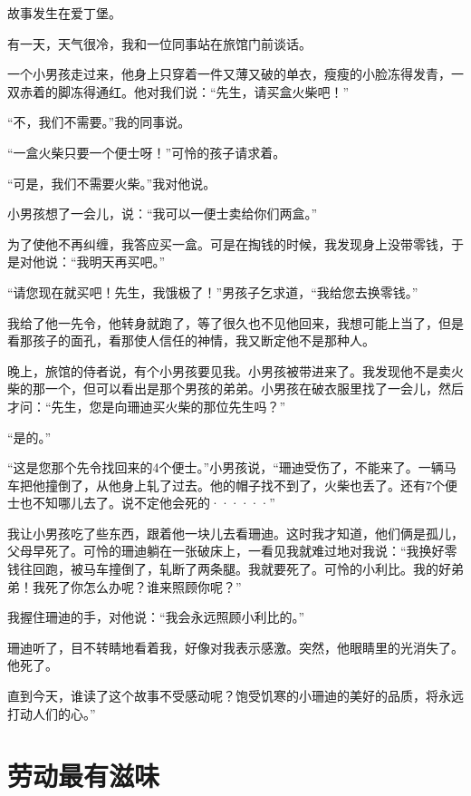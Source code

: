 \documentclass[12pt,UTF-8,openany]{ctexbook}
\begin{document}
\begin{large}
    
    故事发生在爱丁堡。
    
    有一天，天气很冷，我和一位同事站在旅馆门前谈话。
    
    一个小男孩走过来，他身上只穿着一件又薄又破的单衣，瘦瘦的小脸冻得发青，一双赤着的脚冻得通红。他对我们说：“先生，请买盒火柴吧！”
    
    “不，我们不需要。”我的同事说。
    
    “一盒火柴只要一个便士呀！”可怜的孩子请求着。
    
    “可是，我们不需要火柴。”我对他说。
    
    小男孩想了一会儿，说：“我可以一便士卖给你们两盒。”
    
    为了使他不再纠缠，我答应买一盒。可是在掏钱的时候，我发现身上没带零钱，于是对他说：“我明天再买吧。”
    
    “请您现在就买吧！先生，我饿极了！”男孩子乞求道，“我给您去换零钱。”
    
    我给了他一先令，他转身就跑了，等了很久也不见他回来，我想可能上当了，但是看那孩子的面孔，看那使人信任的神情，我又断定他不是那种人。
    
    晚上，旅馆的侍者说，有个小男孩要见我。小男孩被带进来了。我发现他不是卖火柴的那一个，但可以看出是那个男孩的弟弟。小男孩在破衣服里找了一会儿，然后才问：“先生，您是向珊迪买火柴的那位先生吗？”
    
    “是的。”
    
    “这是您那个先令找回来的4个便士。”小男孩说，“珊迪受伤了，不能来了。一辆马车把他撞倒了，从他身上轧了过去。他的帽子找不到了，火柴也丢了。还有7个便士也不知哪儿去了。说不定他会死的······”
    
    我让小男孩吃了些东西，跟着他一块儿去看珊迪。这时我才知道，他们俩是孤儿，父母早死了。可怜的珊迪躺在一张破床上，一看见我就难过地对我说：“我换好零钱往回跑，被马车撞倒了，轧断了两条腿。我就要死了。可怜的小利比。我的好弟弟！我死了你怎么办呢？谁来照顾你呢？”
    
    我握住珊迪的手，对他说：“我会永远照顾小利比的。”
    
    珊迪听了，目不转睛地看着我，好像对我表示感激。突然，他眼睛里的光消失了。他死了。
    
    直到今天，谁读了这个故事不受感动呢？饱受饥寒的小珊迪的美好的品质，将永远打动人们的心。”
    
\end{large}



\chapter{劳动最有滋味}
\end{document}
